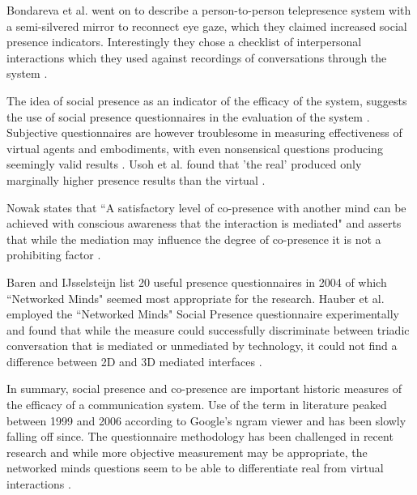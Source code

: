 			     
            Bondareva et al. went on to describe a person-to-person telepresence system with a semi-silvered mirror to reconnect eye gaze, which they claimed increased social presence indicators. Interestingly they chose a checklist of interpersonal interactions which they used against recordings of conversations through the system \cite{Bondareva2004}.  \par
            The idea of social presence as an indicator of the efficacy of the system, suggests the use of social presence questionnaires in the evaluation of the system \cite{Biocca2003}.  Subjective questionnaires are however troublesome in measuring effectiveness of virtual agents and embodiments, with even nonsensical questions producing seemingly valid results \cite{Slater2004}. Usoh et al. found that 'the real' produced only marginally higher presence results than the virtual \cite{Usoh2000a}.\par
            Nowak states that ``A satisfactory level of co-presence with another mind can be achieved with conscious awareness that the interaction is mediated" and asserts that while the mediation may influence the degree of co-presence it is not a prohibiting factor \cite{Nowak2001}.\par 
            Baren and IJsselsteijn \cite{Baren, Harms2004} list 20 useful presence questionnaires in 2004 of which ``Networked Minds" seemed most appropriate for the research.
            Hauber et al. employed the ``Networked Minds" Social Presence questionnaire experimentally and found that while the measure could successfully discriminate between triadic conversation that is mediated or unmediated by technology, it could not find a difference between 2D and 3D mediated interfaces \cite{Hauber2005, Gunawardena1997}.\par
			In summary, social presence and co-presence are important historic measures of the efficacy of a communication system. Use of the term in literature peaked between 1999 and 2006 according to Google's ngram viewer and has been slowly falling off since. The questionnaire methodology has been challenged in recent research and while more objective measurement may be appropriate, the networked minds questions seem to be able to differentiate real from virtual interactions \cite{Harms2004}.
